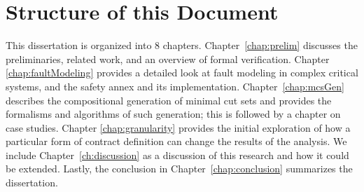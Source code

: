\section{Structure of this Document}
This dissertation is organized into 8 chapters. Chapter~\ref{chap:prelim} discusses the preliminaries, related work, and an overview of formal verification. Chapter \ref{chap:faultModeling} provides a detailed look at fault modeling in complex critical systems, and the safety annex and its implementation. Chapter~\ref{chap:mcsGen} describes the compositional generation of minimal cut sets and provides the formalisms and algorithms of such generation; this is followed by a chapter on case studies. Chapter \ref{chap:granularity} provides the initial exploration of how a particular form of contract definition can change the results of the analysis. We include Chapter~\ref{ch:discussion} as a discussion of this research and how it could be extended. Lastly, the conclusion in Chapter~\ref{chap:conclusion} summarizes the dissertation.











